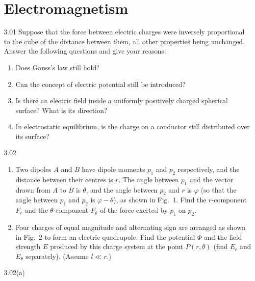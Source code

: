 \section{Electromagnetism}

\begin{problem}{3.01}
Suppose that the force between electric charges were inversely proportional to the cube of the distance between them, all other properties being unchanged. Answer the following questions and give your reasons:
\begin{enumerate}[label=(\arabic*),leftmargin=2.2em,itemsep=1pt,topsep=2pt]
\item Does Gauss's law still hold?
\item Can the concept of electric potential still be introduced?
\item Is there an electric field inside a uniformly positively charged spherical surface? What is its direction?
\item In electrostatic equilibrium, is the charge on a conductor still distributed over its surface?
\end{enumerate}
\end{problem}

\begin{problem}{3.02}
\begin{enumerate}[label=(\arabic*),leftmargin=2.2em,itemsep=1pt,topsep=2pt]
\item Two dipoles $A$ and $B$ have dipole moments $p_1$ and $p_2$ respectively, and the distance between their centres is $r$. The angle between $p_1$ and the vector drawn from $A$ to $B$ is $\theta$, and the angle between $p_2$ and $r$ is $\varphi$ (so that the angle between $p_1$ and $p_2$ is $\varphi-\theta$), as shown in Fig.~1. Find the $r$-component $F_r$ and the $\theta$-component $F_\theta$ of the force exerted by $p_1$ on $p_2$.
\item Four charges of equal magnitude and alternating sign are arranged as shown in Fig.~2 to form an electric quadrupole. Find the potential $\Phi$ and the field strength $E$ produced by this charge system at the point $P(r,\theta)$ (find $E_r$ and $E_\theta$ separately). (Assume $l\ll r$.)
\end{enumerate}
\end{problem}

\begin{figbox}{3.02(a)}
\end{figbox}

